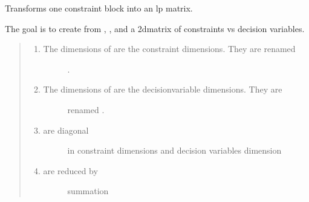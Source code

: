 \documentclass[letterpaper,10pt,english]{sphinxmanual}
\begin{document}
\begin{fulllineitems}
\label{\detokenize{api:muse.constraints.lp_constraint_matrix}}
Transforms one constraint block into an lp matrix.

The goal is to create from , , and  a 2d\sphinxhyphen{}matrix of
constraints vs decision variables.
\begin{quote}
\begin{enumerate}
%
\item {} \begin{description}
\item[{The dimensions of  are the constraint dimensions. They are renamed}] \leavevmode
{}.

\end{description}

\item {} \begin{description}
\item[{The dimensions of  are the decision\sphinxhyphen{}variable dimensions. They are}] \leavevmode
renamed .

\end{description}

\item {} \begin{description}
\item[{ are diagonal}] \leavevmode
in constraint dimensions and decision variables dimension

\end{description}

\item {} \begin{description}
\item[{ are reduced by}] \leavevmode
summation


\end{description}
\end{enumerate}
\end{quote}
\end{fulllineitems}
\end{document}

